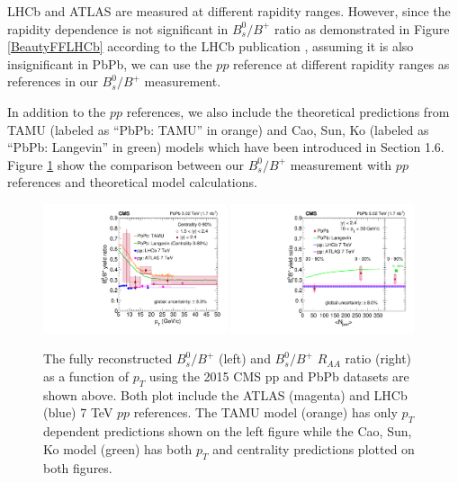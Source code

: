 LHCb and ATLAS are measured at different rapidity ranges. However, since the rapidity dependence is not significant in $B^0_s/B^+$ ratio as demonstrated in Figure \ref{BeautyFFLHCb} according to the LHCb publication \cite{LHCbFF}, assuming it is also insignificant in PbPb, we can use the $pp$ reference at different rapidity ranges as references in our $B^0_s/B^+$ measurement.

In addition to the $pp$ references, we also include the theoretical predictions from TAMU (labeled as ``PbPb: TAMU'' in orange) and Cao, Sun, Ko (labeled as ``PbPb: Langevin'' in green) models which have been introduced in Section 1.6. Figure \ref{FinalResults} show the comparison between our $B^0_s/B^+$ measurement with $pp$ references and theoretical model calculations. 

\begin{figure}[hbtp]
\begin{center}
\includegraphics[width=0.48\textwidth]{Figures/Chapter6/ratio_vsPt_ref1_1.pdf}
\includegraphics[width=0.48\textwidth]{Figures/Chapter6/ratio_vsCent_ref1.pdf}
\caption{The fully reconstructed $B^0_s/B^+$ (left) and $B^0_s/B^+$ $R_{AA}$ ratio (right) as a function of $p_T$ using the 2015 CMS pp and PbPb datasets are shown above. Both plot include the ATLAS (magenta) and LHCb (blue) 7 TeV $pp$ references. The TAMU model (orange) has only $p_T$ dependent predictions shown on the left figure while the Cao, Sun, Ko model (green) has both $p_T$ and centrality predictions plotted on both figures.}
\label{FinalResults}
\end{center}
\end{figure}   
 

